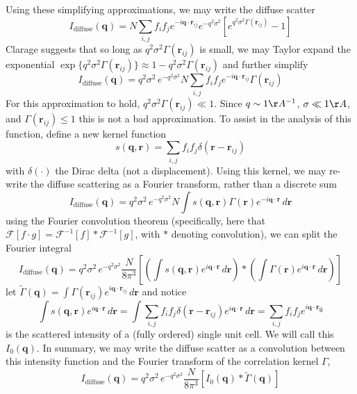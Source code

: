 \documentclass{article}
\begin{document}
Using these simplifying approximations, we may write the diffuse scatter
\[
I_\mathrm{diffuse} (\mathbf{q}) = N \sum\limits_{i,j} f_i f_j e^{-i \mathbf{q} \cdot \mathbf{r}_{ij}} 
%
e^{- q^2 \sigma^2}
%
\left[ 
e^{q^2 \sigma^2 \Gamma(\mathbf{r}_{ij})} - 1
\right]
\]
Clarage suggests that so long as $q^2 \sigma^2 \Gamma(\mathbf{r}_{ij})$ is small, we may Taylor expand the exponential $\exp \{ q^2 \sigma^2 \Gamma(\mathbf{r}_{ij}) \} \approx 1 - q^2 \sigma^2 \Gamma(\mathbf{r}_{ij})$ and further simplify
\[
I_\mathrm{diffuse} (\mathbf{q}) = q^2 \sigma^2 \, e^{- q^2 \sigma^2} N 
\sum\limits_{i,j} f_i f_j e^{-i \mathbf{q} \cdot \mathbf{r}_{ij}} \Gamma(\mathbf{r}_{ij})
\]
For this approximation to hold, $q^2 \sigma^2 \Gamma(\mathbf{r}_{ij}) \ll 1$. Since $q \sim 1 \AA^{-1}$, $\sigma \ll 1 \AA$, and $\Gamma(\mathbf{r}_{ij}) \leq 1$ this is not a bad approximation. To assist in the analysis of this function, define a new kernel function
\[
s( \mathbf{q}, \mathbf{r}) = \sum_{i,j} f_i f_j \delta( \mathbf{r} - \mathbf{r}_{ij})
\]
with $\delta(\cdot)$ the Dirac delta (not a displacement). Using this kernel, we may re-write the diffuse scattering as a Fourier transform, rather than a discrete sum
\[
I_\mathrm{diffuse} (\mathbf{q}) = q^2 \sigma^2 \, e^{- q^2 \sigma^2} N 
\int s( \mathbf{q}, \mathbf{r})  \Gamma(\mathbf{r}) e^{-i \mathbf{q} \cdot \mathbf{r}} \, d \mathbf{r}
\]
using the Fourier convolution theorem (specifically, here that $ \mathcal{F}[ f \cdot g ] = \mathcal{F}^{-1}[f] \ast \mathcal{F}^{-1}[g]$, with $\ast$ denoting convolution), we can split the Fourier integral
\[
I_\mathrm{diffuse} (\mathbf{q}) = q^2 \sigma^2 \, e^{- q^2 \sigma^2} \frac{N}{8 \pi^3} 
\left[ \left( \int s( \mathbf{q}, \mathbf{r})  e^{i \mathbf{q} \cdot \mathbf{r}} \, d \mathbf{r} \right) \ast
\left( \int \Gamma(\mathbf{r})   e^{i \mathbf{q} \cdot \mathbf{r}} \, d \mathbf{r} \right) \right]
\]
let $\tilde{\Gamma} (\mathbf{q}) = \int \Gamma(\mathbf{r}_{ij})   e^{i \mathbf{q} \cdot \mathbf{r}_{ij}} \, d \mathbf{r}$ and notice 
\[
\int s( \mathbf{q}, \mathbf{r})  e^{i \mathbf{q} \cdot \mathbf{r}} \, d \mathbf{r} =
%
\int \sum_{i,j} f_i f_j \delta( \mathbf{r} - \mathbf{r}_{ij}) e^{i \mathbf{q} \cdot \mathbf{r}}  \, d \mathbf{r} =
%
\sum_{i,j} f_i f_j e^{i \mathbf{q} \cdot \mathbf{r_{ij}}}
\]
is the scattered intensity of a (fully ordered) single unit cell. We will call this $I_0(\mathbf{q})$. In summary, we may write the diffuse scatter as a convolution between this intensity function and the Fourier transform of the correlation kernel $\Gamma$,
\[
I_\mathrm{diffuse} (\mathbf{q}) = q^2 \sigma^2 \, e^{- q^2 \sigma^2} \frac{N}{8 \pi^3} 
\left[ I_0(\mathbf{q}) \ast \tilde{\Gamma}(\mathbf{q}) \right]
\]
\end{document}
